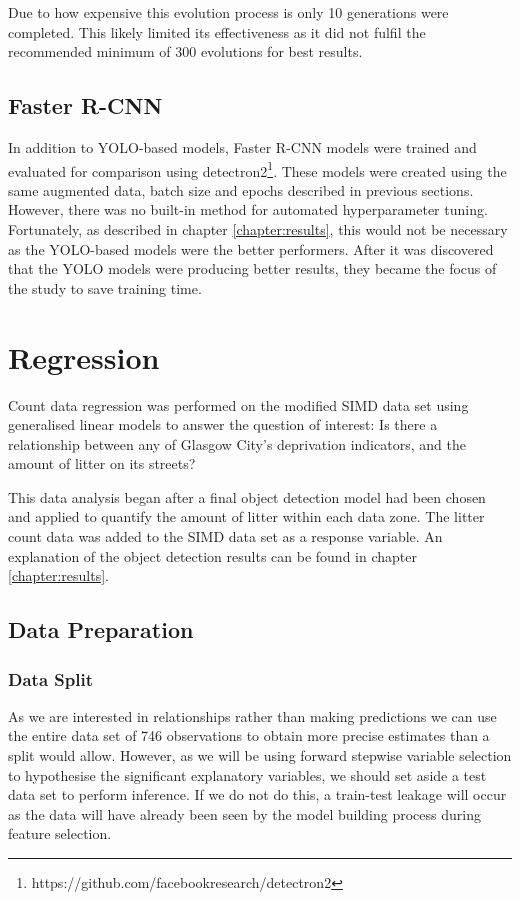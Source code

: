 \documentclass{thesis}
\begin{document}
Due to how expensive this evolution process is only 10 generations were completed. This likely limited its effectiveness as it did not fulfil the recommended minimum of 300 evolutions for best results\cite{yolov5-hyperparam}.

\subsection{Faster R-CNN}

In addition to YOLO-based models, Faster R-CNN models were trained and evaluated for comparison using detectron2\footnote{https://github.com/facebookresearch/detectron2}. These models were created using the same augmented data, batch size and epochs described in previous sections. However, there was no built-in method for automated hyperparameter tuning. Fortunately, as described in chapter \ref{chapter:results}, this would not be necessary as the YOLO-based models were the better performers. After it was discovered that the YOLO models were producing better results, they became the focus of the study to save training time.

\section{Regression}

Count data regression was performed on the modified SIMD data set using generalised linear models to answer the question of interest: Is there a relationship between any of Glasgow City's deprivation indicators, and the amount of litter on its streets?

This data analysis began after a final object detection model had been chosen and applied to quantify the amount of litter within each data zone. The litter count data was added to the SIMD data set as a response variable. An explanation of the object detection results can be found in chapter \ref{chapter:results}. 

\subsection{Data Preparation}

\subsubsection{Data Split}

As we are interested in relationships rather than making predictions we can use the entire data set of 746 observations to obtain more precise estimates than a split would allow. However, as we will be using forward stepwise variable selection to hypothesise the significant explanatory variables, we should set aside a test data set to perform inference. If we do not do this, a train-test leakage will occur as the data will have already been seen by the model building process during feature selection.
\end{document}
